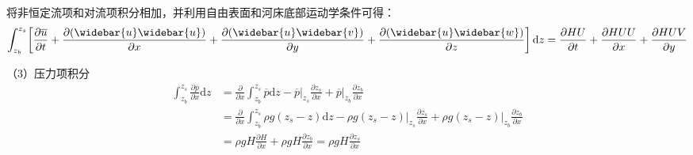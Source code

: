 将非恒定流项和对流项积分相加，并利用自由表面和河床底部运动学条件可得：
\begin{equation}
  \int_{z_{b}}^{ z_{s}}\!
  \left[
    \frac{\partial \overline{u}}{\partial t} +
    \frac{\partial (\widebar{u}\widebar{u})}{\partial x} +
    \frac{\partial (\widebar{u}\widebar{v})}{\partial y} +
    \frac{\partial (\widebar{u}\widebar{w})}{\partial z}
  \right]
  \mathrm{d}z
  =
  \frac{\partial HU}{\partial t}
  +
  \frac{\partial HUU}{\partial x}
  +
  \frac{\partial HUV}{\partial y}
\end{equation}

（3）压力项积分
\begin{equation}
  \begin{aligned}
    \int_{z_{b}}^{ z_{s}}\!
    \frac{\partial \overline{p}}{\partial x}
    \mathrm{d}z
    &=
    \frac{\partial}{\partial x}
    \int_{z_{b}}^{ z_{s}}\!
    \overline{p}
    \mathrm{d}z
    -
    \left.\overline{p}\right|_{z_{s}}\frac{\partial  z_{s}}{\partial x}
    +
    \left.\overline{p}\right|_{z_{b}}\frac{\partial z_{b}}{\partial x}
    \\
    &=
    \frac{\partial}{\partial x}
    \int_{z_{b}}^{ z_{s}}\!
    \rho g( z_{s}-z)
    \mathrm{d}z
    -
    \left.\rho g( z_{s}-z)\right|_{z_{s}}\frac{\partial  z_{s}}{\partial x}
    +
    \left.\rho g( z_{s}-z)\right|_{z_{b}}\frac{\partial z_{b}}{\partial x}
    \\
    &=
    \rho gH\frac{\partial H}{\partial x}
    +
    \rho gH\frac{\partial z_{b}}{\partial x}
    =
    \rho gH\frac{\partial  z_{s}}{\partial x}
  \end{aligned}
\end{equation}

